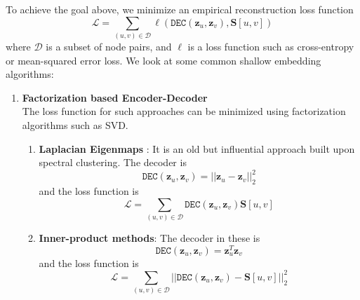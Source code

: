 To achieve the goal above, we minimize an empirical reconstruction loss function
\begin{equation}
\mathcal{L} = \sum_{(u, v) \in \mathcal{D}} \ell(\texttt{DEC}(\mathbf{z}_u, \mathbf{z}_v), \mathbf{S}[u,v])
\end{equation}
\noindent where $\mathcal{D}$ is a subset of node pairs, and $\ell$ is a loss function such as cross-entropy or mean-squared error loss. We look at some common shallow embedding algorithms:
\begin{enumerate}
\item \textbf{Factorization based Encoder-Decoder}\\
The loss function for such approaches can be minimized using factorization algorithms such as SVD.
\begin{enumerate}
\item \textbf{Laplacian Eigenmaps} \cite{laplacian-eigenmaps}: 
It is an old but influential approach built upon spectral clustering. The decoder is 
\begin{equation}
	\texttt{DEC}(\mathbf{z}_u, \mathbf{z}_v) = ||\mathbf{z}_u - \mathbf{z}_v||_2^2
\end{equation}
and the loss function is
 \begin{equation}
\mathcal{L} = \sum_{(u,v) \in \mathcal{D}} \texttt{DEC}(\mathbf{z}_u, \mathbf{z}_v)\mathbf{S}[u,v]
\end{equation}
\item \textbf{Inner-product methods}: The decoder in these is 
\begin{equation}
\texttt{DEC}(\mathbf{z}_u, \mathbf{z}_v) = \mathbf{z}_u^T\mathbf{z}_v
\end{equation}
and the loss function is
\begin{equation}
\mathcal{L} = \sum_{(u,v) \in \mathcal{D}} ||\texttt{DEC}(\mathbf{z}_u, \mathbf{z}_v) - \mathbf{S}[u,v]||_2^2
\end{equation}


\end{enumerate}
\end{enumerate}
